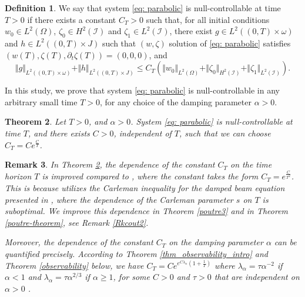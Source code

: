 \documentclass[a4paper, 12pt]{article}
\theoremstyle{plain}
\newtheorem{theorem}{Theorem}[section]
\newtheorem{remark}[theorem]{Remark}
\theoremstyle{definition}
\newtheorem{definition}[theorem]{Definition}
\numberwithin{theorem}{section}
\numberwithin{equation}{section}
\begin{document}
\begin{definition}
We say that system \eqref{eq: parabolic} is null-controllable at time $T>0$ if there exists a constant $C_T>0$ such that, for all initial conditions $w_0\in L^2(\Omega)$, $\zeta_0\in H^2(\mathcal I)$ and $\zeta_1 \in L^2(\mathcal I)$, there exist  $g \in L^2((0,T)\times \omega)$ and $h \in L^2((0,T) \times J)$ such that $(w,\zeta)$ solution of \eqref{eq: parabolic} satisfies $(w(T),\zeta(T),\partial_t\zeta(T)) = (0,0,0)$, 
and 
$$
\Vert g\Vert_{L^2((0,T)\times \omega)} + \Vert h \Vert_{L^2((0,T)\times J)} \leq C_T
\left( \Vert w_0\Vert_{L^2(\Omega)} + \Vert \zeta_0 \Vert_{H^2(\mathcal I)} + \Vert \zeta_1 \Vert_{L^2(\mathcal I)} \right).
$$
\end{definition}

In this study, we prove that system \eqref{eq: parabolic} is null-controllable in any arbitrary small time $T>0$, for any choice of the damping parameter $\alpha>0$.

\begin{theorem} \label{thm_nullcontrollability_intro}
Let $T>0$, and $\alpha>0$. System \eqref{eq: parabolic} is null-controllable at time $T$, and there exists $C>0$, independent of $T$, such that we can choose $C_T = C e^{\frac{C}{T}}$.
\end{theorem}
\begin{remark}
In Theorem \ref{thm_nullcontrollability_intro}, the dependence of the constant $C_T$ on the time horizon $T$ is improved compared to \cite{Buffe}, where the constant takes the form $C_T = e^{\frac{C}{T^2}}$. 
This is because \cite{Buffe} utilizes the Carleman inequality for the damped beam equation presented in \cite{Sourav}, where the dependence of the Carleman parameter $s$ on $T$ is suboptimal. We improve this dependence in Theorem \ref{poutre3} and in Theorem \ref{poutre-theorem}, see Remark \ref{Rkcout2}.

Moreover, the dependence of the constant $C_T$ on the damping parameter $\alpha$ can be quantified precisely. According to Theorem \ref{thm_observability_intro} and Theorem \ref{observability} below, we have $C_T=Ce^{e^{C\lambda_\alpha}\left(1+\frac{1}{T}\right)}$ where $\lambda_\alpha=\tau\alpha^{-2}$ if $\alpha<1$ and $\lambda_\alpha=\tau\alpha^{2/3}$ if $\alpha\geq 1$, for some $C>0$ and $\tau>0$ that are independent on $\alpha>0$ .
\end{remark}

\end{document}
